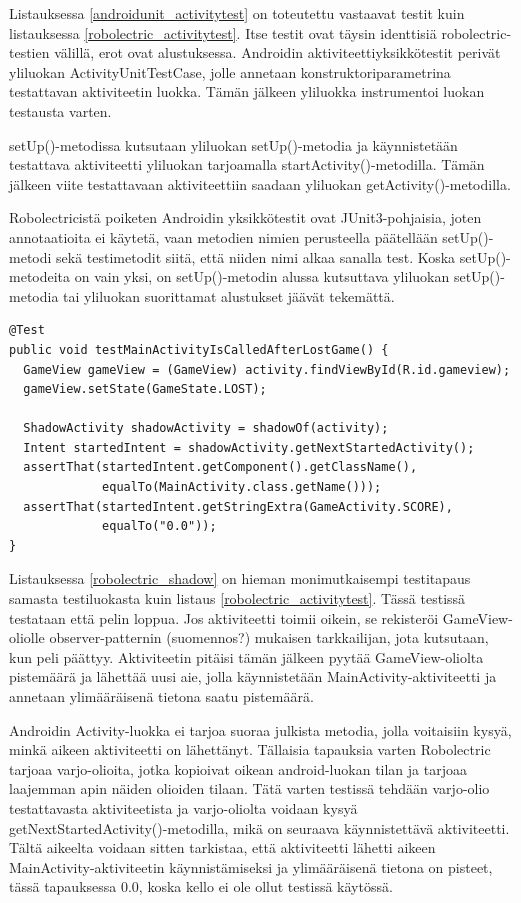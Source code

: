 Listauksessa \ref{androidunit_activitytest} on toteutettu vastaavat testit kuin listauksessa \ref{robolectric_activitytest}. Itse testit ovat täysin identtisiä robolectric-testien välillä, erot ovat alustuksessa. Androidin aktiviteettiyksikkötestit perivät yliluokan ActivityUnitTestCase, jolle annetaan konstruktoriparametrina testattavan aktiviteetin luokka. Tämän jälkeen yliluokka instrumentoi luokan testausta varten.

setUp()-metodissa kutsutaan yliluokan setUp()-metodia ja käynnistetään testattava aktiviteetti yliluokan tarjoamalla startActivity()-metodilla. Tämän jälkeen viite testattavaan aktiviteettiin saadaan yliluokan getActivity()-metodilla.

Robolectricistä poiketen Androidin yksikkötestit ovat JUnit3-pohjaisia, joten annotaatioita ei käytetä, vaan metodien nimien perusteella päätellään setUp()-metodi sekä testimetodit siitä, että niiden nimi alkaa sanalla test. Koska setUp()-metodeita on vain yksi, on setUp()-metodin alussa kutsuttava yliluokan setUp()-metodia tai yliluokan suorittamat alustukset jäävät tekemättä.

\begin{lstlisting}[float,label=robolectric_shadow,caption=Robolectric Shadow objects]
@Test
public void testMainActivityIsCalledAfterLostGame() {
  GameView gameView = (GameView) activity.findViewById(R.id.gameview);
  gameView.setState(GameState.LOST);
  	
  ShadowActivity shadowActivity = shadowOf(activity);
  Intent startedIntent = shadowActivity.getNextStartedActivity();
  assertThat(startedIntent.getComponent().getClassName(), 
             equalTo(MainActivity.class.getName()));
  assertThat(startedIntent.getStringExtra(GameActivity.SCORE), 
             equalTo("0.0"));
}
\end{lstlisting}

Listauksessa \ref{robolectric_shadow} on hieman monimutkaisempi testitapaus samasta testiluokasta kuin listaus \ref{robolectric_activitytest}. Tässä testissä testataan että pelin loppua. Jos aktiviteetti toimii oikein, se rekisteröi GameView-oliolle observer-patternin (suomennos?) mukaisen tarkkailijan, jota kutsutaan, kun peli päättyy. Aktiviteetin pitäisi tämän jälkeen pyytää GameView-oliolta pistemäärä ja lähettää uusi aie, jolla käynnistetään MainActivity-aktiviteetti ja annetaan ylimääräisenä tietona saatu pistemäärä.

Androidin Activity-luokka ei tarjoa suoraa julkista metodia, jolla voitaisiin kysyä, minkä aikeen aktiviteetti on lähettänyt. Tällaisia tapauksia varten Robolectric tarjoaa varjo-olioita, jotka kopioivat oikean android-luokan tilan ja tarjoaa laajemman apin näiden olioiden tilaan. Tätä varten testissä tehdään varjo-olio testattavasta aktiviteetista ja varjo-oliolta voidaan kysyä getNextStartedActivity()-metodilla, mikä on seuraava käynnistettävä aktiviteetti. Tältä aikeelta voidaan sitten tarkistaa, että aktiviteetti lähetti aikeen MainActivity-aktiviteetin käynnistämiseksi ja ylimääräisenä tietona on pisteet, tässä tapauksessa 0.0, koska kello ei ole ollut testissä käytössä.

